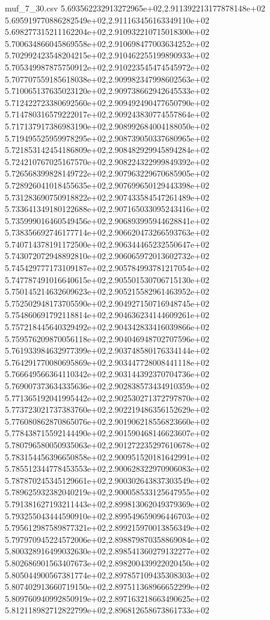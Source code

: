 \begin{filecontents*}{muf_7_30.csv}
5.693562232913272965e+02,2.911392213177878148e+02
5.695919770886282549e+02,2.911163456163349110e+02
5.698277315211162204e+02,2.910932210715018300e+02
5.700634866045869558e+02,2.910698477003634252e+02
5.702992423548204215e+02,2.910462255199890933e+02
5.705349987875750912e+02,2.910223545474545972e+02
5.707707559185618038e+02,2.909982347998602563e+02
5.710065137635023120e+02,2.909738662942645533e+02
5.712422723380692560e+02,2.909492490477650790e+02
5.714780316579222017e+02,2.909243830774557864e+02
5.717137917386983190e+02,2.908992684004188050e+02
5.719495525959978295e+02,2.908739050337680965e+02
5.721853142454186809e+02,2.908482929945894284e+02
5.724210767025167570e+02,2.908224322999849392e+02
5.726568399828149722e+02,2.907963229670685905e+02
5.728926041018455635e+02,2.907699650129443398e+02
5.731283690750918822e+02,2.907433584547261489e+02
5.733641349180122688e+02,2.907165033095243416e+02
5.735999016460549456e+02,2.906893995944628841e+02
5.738356692746177714e+02,2.906620473266593763e+02
5.740714378191172500e+02,2.906344465232550647e+02
5.743072072948892810e+02,2.906065972013602732e+02
5.745429777173109187e+02,2.905784993781217054e+02
5.747787491016640615e+02,2.905501530706715130e+02
5.750145214632609623e+02,2.905215582961463952e+02
5.752502948173705590e+02,2.904927150716948745e+02
5.754860691792118814e+02,2.904636234144609261e+02
5.757218445640329492e+02,2.904342833416039866e+02
5.759576209870056118e+02,2.904046948702707596e+02
5.761933984632977399e+02,2.903748580176334144e+02
5.764291770080695869e+02,2.903447728008441118e+02
5.766649566364110342e+02,2.903144392370704736e+02
5.769007373634335636e+02,2.902838573434910359e+02
5.771365192041995442e+02,2.902530271372797870e+02
5.773723021737383760e+02,2.902219486356152629e+02
5.776080862870865076e+02,2.901906218556823660e+02
5.778438715592144490e+02,2.901590468146623607e+02
5.780796580050935063e+02,2.901272235297610678e+02
5.783154456396650858e+02,2.900951520181642991e+02
5.785512344778453553e+02,2.900628322970906083e+02
5.787870245345129661e+02,2.900302643837303549e+02
5.789625932382040219e+02,2.900058533125647955e+02
5.791381627193211443e+02,2.899813062049379369e+02
5.793255043444590910e+02,2.899549659096446703e+02
5.795612987589877321e+02,2.899215970013856349e+02
5.797970945224572006e+02,2.898879870358869084e+02
5.800328916499032630e+02,2.898541360279132277e+02
5.802686901563407673e+02,2.898200439922020450e+02
5.805044900567381774e+02,2.897857109435308303e+02
5.807402913660719150e+02,2.897511368966652299e+02
5.809760940992850919e+02,2.897163218663490625e+02
5.812118982712822799e+02,2.896812658673861733e+02

\end{filecontents*}
